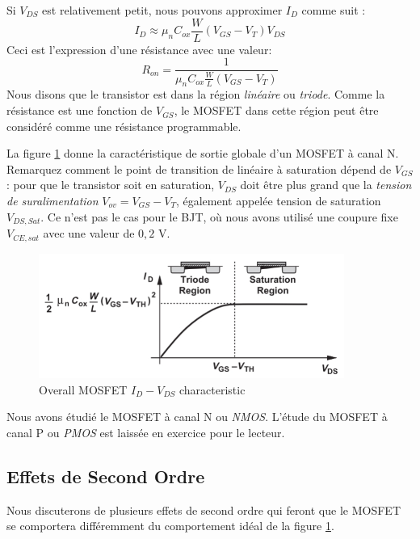 Si $V_{DS}$ est relativement petit, nous pouvons approximer $I_D$ comme suit :
$$I_D \approx  \mu_n C_{ox} \frac{W}{L} (V_{GS} - V_T) V_{DS}$$
Ceci est l'expression d'une résistance avec une valeur:
$$R_{on} = \frac{1}{\mu_n C_{ox} \frac{W}{L} (V_{GS} - V_T)}$$
Nous disons que le transistor est dans la région \emph{linéaire} ou \emph{triode}. Comme la résistance est une fonction de $V_{GS}$, le MOSFET dans cette région peut être considéré comme une résistance programmable.

La figure \ref{fig:mosfet3} donne la caractéristique de sortie globale d'un MOSFET à canal N. Remarquez comment le point de transition de linéaire à saturation dépend de $V_{GS}$ : pour que le transistor soit en saturation, $V_{DS}$ doit être plus grand que la \emph{tension de suralimentation} $V_{ov} = V_{GS} - V_T$, également appelée tension de saturation $V_{DS, Sat}$. Ce n'est pas le cas pour le BJT, où nous avons utilisé une coupure fixe $V_{CE,sat}$ avec une valeur de $0,2$ V.

\begin{figure}[h!]
\centering
\includegraphics[width=10cm]{figures/ch01/mosfet3.jpg}
\caption{Overall MOSFET $I_D - V_{DS}$ characteristic} 
\label{fig:mosfet3}
\end{figure}
Nous avons étudié le MOSFET à canal N ou \emph{NMOS}. L'étude du MOSFET à canal P ou \emph{PMOS} est laissée en exercice pour le lecteur.

\subsection{Effets de Second Ordre}
Nous discuterons de plusieurs effets de second ordre qui feront que le MOSFET se comportera différemment du comportement idéal de la figure \ref{fig:mosfet3}.
